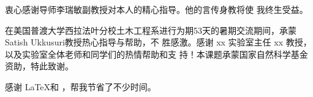 \begin{acknowledgement}
  衷心感谢导师李瑞敏副教授对本人的精心指导。他的言传身教将使
  我终生受益。

  在美国普渡大学西拉法叶分校土木工程系进行为期53天的暑期交流期间，承蒙Satish Ukkusuri教授热心指导与帮助，不
  胜感激。感谢 xx 实验室主任 xx 教授，以及实验室全体老师和同学们的热情帮助和支
  持！本课题承蒙国家自然科学基金资助，特此致谢。

  感谢 \LaTeX 和 \thuthesis\cite{thuthesis}，帮我节省了不少时间。
\end{acknowledgement}
